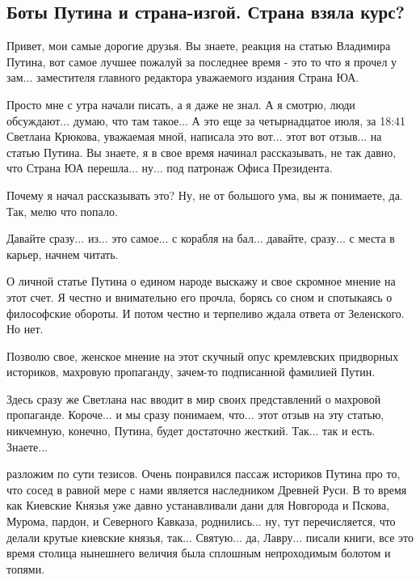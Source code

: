  
 
 
 
 
\subsection{Боты Путина и страна-изгой. Страна взяла курс?}

Привет, мои самые дорогие друзья. Вы знаете, реакция на статью Владимира
Путина, вот самое лучшее пожалуй за последнее время - это то что я прочел у
зам... заместителя главного редактора уважаемого издания Страна ЮА.

Просто мне с утра начали писать, а я даже не знал. А я смотрю, люди
обсуждают... думаю, что там такое... А это еще за четырнадцатое июля, за 18:41
Светлана Крюкова, уважаемая мной, написала это вот... этот вот отзыв... на
статью Путина. Вы знаете, я в свое время начинал рассказывать, не так давно,
что Страна ЮА перешла... ну... под патронаж Офиса Президента.

Почему я начал рассказывать это? Ну, не от большого ума, вы ж понимаете, да.
Так, мелю что попало. 

Давайте сразу... из... это самое... с корабля на бал... давайте, сразу... с
места в карьер, начнем читать.

О личной статье Путина о едином народе выскажу и свое скромное мнение на этот счет.
Я честно и внимательно его прочла, борясь со сном и спотыкаясь о философские обороты.
И потом честно и терпеливо ждала ответа от Зеленского. Но нет. 

Позволю свое, женское мнение на этот скучный опус кремлевских придворных историков, 
махровую пропаганду, зачем-то подписанной фамилией Путин.

Здесь сразу же Светлана нас вводит в мир своих представлений о махровой пропаганде.
Короче... и мы сразу понимаем, что... этот отзыв на эту статью, никчемную, конечно,
Путина, будет достаточно жесткий. Так... так и есть. Знаете... 

разложим по сути тезисов. Очень понравился пассаж историков Путина про то, что сосед 
в равной мере с нами является наследником Древней Руси. В то время как Киевские Князья уже 
давно устанавливали дани для Новгорода и Пскова, Мурома, пардон, и Северного Кавказа, роднились... 
ну, тут перечисляется, что делали крутые киевские князья, так... Святую... да, Лавру... писали книги,
все это время столица нынешнего величия была сплошным непроходимым болотом и топями. 

